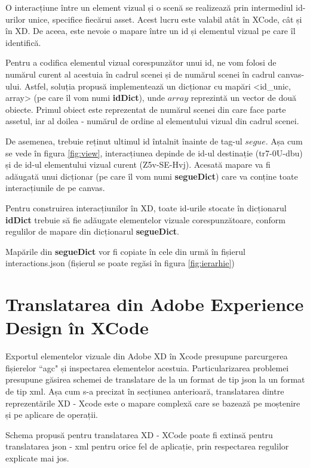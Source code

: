 O interacțiune între un element vizual și o scenă se realizează prin intermediul id-urilor unice, specifice fiecărui asset. Acest lucru este valabil atât în XCode, cât și în XD. De aceea, este nevoie o mapare între un id și elementul vizual pe care îl identifică. 

Pentru a codifica elementul vizual corespunzător unui id, ne vom folosi de numărul curent al acestuia în cadrul scenei și de numărul scenei în cadrul canvas-ului. Astfel, soluția propusă implementează un dicționar cu mapări <id_unic, array> (pe care îl vom numi \textbf{idDict}), unde $array$ reprezintă un vector de două obiecte. Primul obiect este reprezentat de numărul scenei din care face parte assetul, iar al doilea - numărul de ordine al elementului vizual din cadrul scenei.

De asemenea, trebuie reținut ultimul id întalnit înainte de tag-ul $segue$. Așa cum se vede în figura \ref{fig:view}, interacțiunea depinde de id-ul destinație (tr7-0U-dbu) și de id-ul elementului vizual curent (Z5v-SE-Hvj). Acesată mapare va fi adăugată unui dicționar (pe care îl vom numi \textbf{segueDict}) care va conține toate interacțiunile de pe canvas.

Pentru construirea interacțiunilor în XD, toate id-urile stocate în dicționarul \textbf{idDict} trebuie să fie adăugate elementelor vizuale corespunzătoare, conform regulilor de mapare din dicționarul \textbf{segueDict}.

Mapările din \textbf{segueDict} vor fi copiate în cele din urmă în fișierul interactions.json (fișierul se poate regăsi în figura \ref{fig:ierarhie})

\section{Translatarea din Adobe Experience Design în XCode}\label{xd2xcodev1}

Exportul elementelor vizuale din Adobe XD în Xcode presupune parcurgerea fișierelor ``agc" și inspectarea elementelor acestuia. Particularizarea problemei presupune găsirea schemei de translatare de la un format de tip json la un format de tip xml. Așa cum s-a precizat în secțiunea anterioară, translatarea dintre reprezentările XD - Xcode este o mapare complexă care se bazează pe moștenire și pe aplicare de operații. 

Schema propusă pentru translatarea XD - XCode poate fi extinsă pentru translatarea json - xml pentru orice fel de aplicație, prin respectarea regulilor explicate mai jos. 

